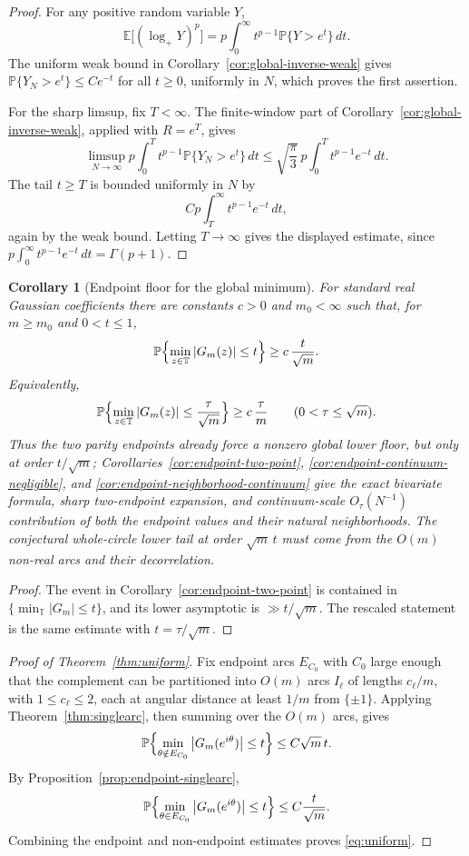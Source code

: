 \documentclass[11pt]{amsart}
\numberwithin{equation}{section}
\newtheorem{corollary}[theorem]{Corollary}
\theoremstyle{definition}
\theoremstyle{remark}
\newcommand{\T}{\mathbb T}
\newcommand{\Prob}{\mathbb P}
\newcommand{\Exp}{\mathbb E}
\newcommand{\abs}[1]{\left\lvert #1\right\rvert}
\begin{document}
\begin{proof}
For any positive random variable \(Y\),
\[
  \Exp\bigl[(\log_+Y)^p\bigr]
  =
  p\int_0^\infty t^{p-1}\Prob\{Y>e^t\}\,dt .
\]
The uniform weak bound in Corollary~\ref{cor:global-inverse-weak} gives
\(\Prob\{Y_N>e^t\}\le Ce^{-t}\) for all \(t\ge0\), uniformly in \(N\), which
proves the first assertion.

For the sharp limsup, fix \(T<\infty\).  The finite-window part of
Corollary~\ref{cor:global-inverse-weak}, applied with \(R=e^T\), gives
\[
  \limsup_{N\to\infty}
  p\int_0^T t^{p-1}\Prob\{Y_N>e^t\}\,dt
  \le
  \sqrt{\frac{\pi}{3}}\,
  p\int_0^T t^{p-1}e^{-t}\,dt .
\]
The tail \(t\ge T\) is bounded uniformly in \(N\) by
\[
  Cp\int_T^\infty t^{p-1}e^{-t}\,dt ,
\]
again by the weak bound.  Letting \(T\to\infty\) gives the displayed estimate,
since \(p\int_0^\infty t^{p-1}e^{-t}\,dt=\Gamma(p+1)\).
\end{proof}

\begin{corollary}[Endpoint floor for the global minimum]
\label{cor:endpoint-global-floor}
For standard real Gaussian coefficients there are constants \(c>0\) and
\(m_0<\infty\) such that, for \(m\ge m_0\) and \(0<t\le1\),
\[
  \Prob\Bigl\{\min_{z\in\T}|G_m(z)|\le t\Bigr\}
  \ge c\,\frac{t}{\sqrt m}.
\]
Equivalently,
\[
  \Prob\Bigl\{\min_{z\in\T}|G_m(z)|\le \frac{\tau}{\sqrt m}\Bigr\}
  \ge c\,\frac{\tau}{m}
  \qquad(0<\tau\le \sqrt m).
\]
Thus the two parity endpoints already force a nonzero global lower floor, but
only at order \(t/\sqrt m\); Corollaries~\ref{cor:endpoint-two-point},
\ref{cor:endpoint-continuum-negligible}, and
\ref{cor:endpoint-neighborhood-continuum} give the exact bivariate formula,
sharp two-endpoint expansion, and continuum-scale \(O_\tau(N^{-1})\)
contribution of both the endpoint values and their natural neighborhoods.  The
conjectural whole-circle lower tail at order \(\sqrt m\,t\) must come from the
\(O(m)\) non-real arcs and their decorrelation.
\end{corollary}

\begin{proof}
The event in Corollary~\ref{cor:endpoint-two-point} is contained in
\(\{\min_{\T}\abs{G_m}\le t\}\), and its lower asymptotic is
\(\gg t/\sqrt m\).  The rescaled statement is the same estimate with
\(t=\tau/\sqrt m\).
\end{proof}

\begin{proof}[Proof of Theorem~\ref{thm:uniform}]
Fix endpoint arcs \(E_{C_0}\) with \(C_0\) large enough that the complement can
be partitioned into \(O(m)\) arcs \(I_\ell\) of lengths \(c_\ell/m\), with
\(1\le c_\ell\le2\), each at angular distance at least \(1/m\) from
\(\{\pm1\}\).  Applying Theorem~\ref{thm:singlearc}, then summing over the
\(O(m)\) arcs, gives
\[
  \Prob\Bigl\{\min_{\theta\notin E_{C_0}}\abs{G_m(e^{i\theta})}\le t\Bigr\}
  \le C\sqrt m\,t.
\]
By Proposition~\ref{prop:endpoint-singlearc},
\[
  \Prob\Bigl\{\min_{\theta\in E_{C_0}}\abs{G_m(e^{i\theta})}\le t\Bigr\}
  \le C\frac{t}{\sqrt m}.
\]
Combining the endpoint and non-endpoint estimates proves \eqref{eq:uniform}.
\end{proof}
\end{document}
